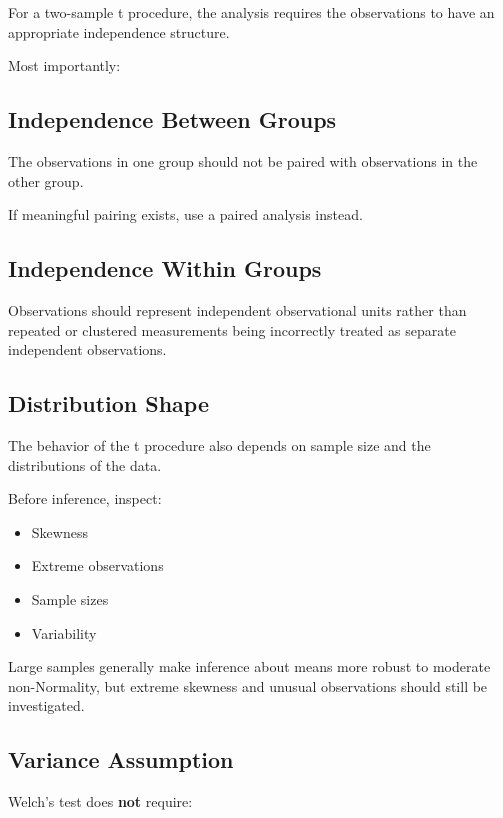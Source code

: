 \documentclass[
  letterpaper,
  DIV=11,
  numbers=noendperiod]{scrreprt}
\providecommand{\tightlist}{%
  \setlength{\itemsep}{0pt}\setlength{\parskip}{0pt}}
\begin{document}
For a two-sample t procedure, the analysis requires the observations to
have an appropriate independence structure.

Most importantly:

\subsection{Independence Between
Groups}\label{independence-between-groups}

The observations in one group should not be paired with observations in
the other group.

If meaningful pairing exists, use a paired analysis instead.

\subsection{Independence Within
Groups}\label{independence-within-groups}

Observations should represent independent observational units rather
than repeated or clustered measurements being incorrectly treated as
separate independent observations.

\subsection{Distribution Shape}\label{distribution-shape}

The behavior of the t procedure also depends on sample size and the
distributions of the data.

Before inference, inspect:

\begin{itemize}
\tightlist
\item
  Skewness
\item
  Extreme observations
\item
  Sample sizes
\item
  Variability
\end{itemize}

Large samples generally make inference about means more robust to
moderate non-Normality, but extreme skewness and unusual observations
should still be investigated.

\subsection{Variance Assumption}\label{variance-assumption}

Welch's test does \textbf{not} require:
\end{document}
